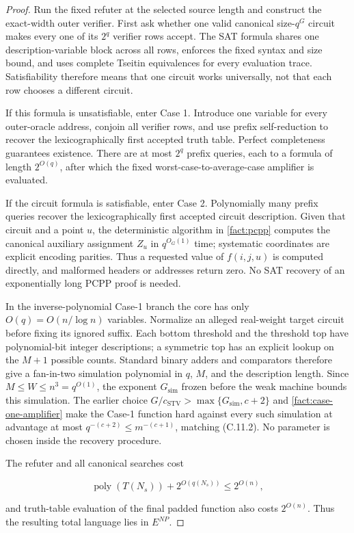 \documentclass[11pt,letterpaper]{article}
\newcommand{\cref}[1]{\ref{#1}}
\theoremstyle{definition}
\theoremstyle{remark}
\begin{document}
\begin{proof} Run the fixed refuter at the selected source length and
construct the exact-width outer verifier. First ask whether one valid
canonical size-\(q^G\) circuit makes every one of its \(2^q\) verifier
rows accept. The SAT formula shares one description-variable block
across all rows, enforces the fixed syntax and size bound, and uses
complete Tseitin equivalences for every evaluation trace. Satisfiability
therefore means that one circuit works universally, not that each row
chooses a different circuit.

If this formula is unsatisfiable, enter Case 1. Introduce one variable
for every outer-oracle address, conjoin all verifier rows, and use
prefix self-reduction to recover the lexicographically first accepted
truth table. Perfect completeness guarantees existence. There are at
most \(2^q\) prefix queries, each to a formula of length \(2^{O(q)}\),
after which the fixed worst-case-to-average-case amplifier is evaluated.

If the circuit formula is satisfiable, enter Case 2. Polynomially many
prefix queries recover the lexicographically first accepted circuit
description. Given that circuit and a point \(u\), the deterministic
algorithm in \cref{fact:pcpp} computes the canonical auxiliary assignment
\(Z_u\) in \(q^{O_G(1)}\) time; systematic coordinates are explicit
encoding parities. Thus a requested value of \(f(i,j,u)\) is computed
directly, and malformed headers or addresses return zero. No SAT
recovery of an exponentially long PCPP proof is needed.

In the inverse-polynomial Case-1 branch the core has only
\(O(q)=O(n/\log n)\) variables. Normalize an alleged real-weight target
circuit before fixing its ignored suffix. Each bottom threshold and the
threshold top have polynomial-bit integer descriptions; a symmetric top
has an explicit lookup on the \(M+1\) possible counts. Standard binary
adders and comparators therefore give a fan-in-two simulation polynomial
in \(q\), \(M\), and the description length. Since
\(M\le W\le n^3=q^{O(1)}\), the exponent \(G_{\mathrm{sim}}\) frozen
before the weak machine bounds this simulation. The earlier choice
\(G/c_{\mathrm{STV}}>\max\{G_{\mathrm{sim}},c+2\}\) and \cref{fact:case-one-amplifier} make
the Case-1 function hard against every such simulation at advantage at
most \(q^{-(c+2)}\le m^{-(c+1)}\), matching (C.11.2). No parameter is
chosen inside the recovery procedure.

The refuter and all canonical searches cost

\[
\operatorname{poly}(T(N_s))+2^{O(q(N_s))}
\le
2^{O(n)},
\]

and truth-table evaluation of the final padded function also costs
\(2^{O(n)}\). Thus the resulting total language lies in \(E^{NP}\).
\end{proof}
\end{document}
